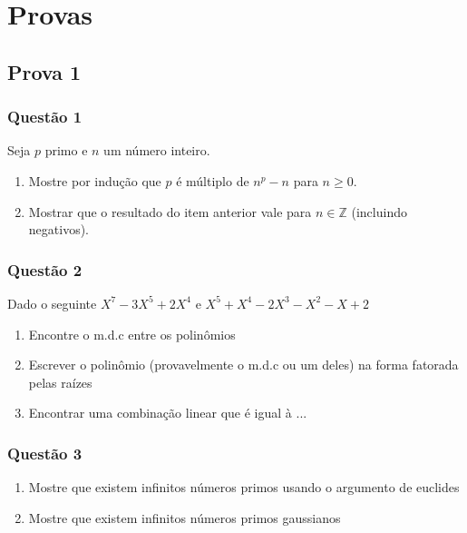 \section{Provas}

    \subsection{Prova 1}
        
        \subsubsection*{Questão 1}
            Seja $p$ primo e $n$ um número inteiro.  
            \begin{enumerate}[label=\alph*), left=0.5cm, align=left, nosep]
                \item Mostre por indução que $p$ é múltiplo de $n^p - n$ para $n \geq 0$.  
                \item Mostrar que o resultado do item anterior vale para $n \in \mathbb{Z}$ (incluindo negativos).
            \end{enumerate}
        
        \subsubsection*{Questão 2}
            Dado o seguinte $X^7 - 3X^5 + 2X^4 \text{ e } X^5 + X^4 - 2X^3 - X^2 - X + 2$
            \begin{enumerate}[label=\alph*), left=0.5cm, align=left, nosep]
                \item Encontre o m.d.c entre os polinômios
                \item Escrever o polinômio (provavelmente o m.d.c ou um deles) na forma fatorada pelas raízes
                \item Encontrar uma combinação linear que é igual à ...
            \end{enumerate}
        
        \subsubsection*{Questão 3}
            \begin{enumerate}[label=\alph*), left=0.5cm, align=left, nosep]
                \item Mostre que existem infinitos números primos usando o argumento de euclides 
                \item Mostre que existem infinitos números primos gaussianos
            \end{enumerate}

